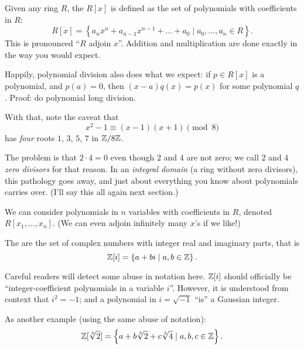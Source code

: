 \begin{example}
	Given any ring $R$,
	the  $R[x]$ is defined as the set of polynomials
	with coefficients in $R$:
	\[ R[x] = \left\{ a_n x^n+a_{n-1}x^{n-1}+\dots+a_0
		\mid a_0, \dots, a_n \in R \right\}. \]
	This is pronounced ``$R$ adjoin $x$''.
	Addition and multiplication are done exactly in the way you would expect.
\end{example}
\begin{remark}
	Happily, polynomial division also does what we expect:
	if $p \in R[x]$ is a polynomial, and $p(a) = 0$,
	then $(x-a)q(x) = p(x)$ for some polynomial $q$.
	Proof: do polynomial long division.

	With that, note the caveat that
	\[ x^2-1 \equiv (x-1)(x+1) \pmod 8 \]
	has \emph{four} roots $1$, $3$, $5$, $7$ in $\mathbb Z/8\mathbb Z$.

	The problem is that $2 \cdot 4 = 0$ even though $2$ and $4$ are not zero;
	we call $2$ and $4$ \emph{zero divisors} for that reason.
	In an \emph{integral domain} (a ring without zero divisors),
	this pathology goes away,
	and just about everything you know about polynomials carries over.
	(I'll say this all again next section.)
\end{remark}
\begin{example}
	We can consider polynomials in $n$ variables with coefficients in $R$,
	denoted $R[x_1, \dots, x_n]$.
	(We can even adjoin infinitely many $x$'s if we like!)
\end{example}

\begin{example}
	The  are the set of complex numbers
	with integer real and imaginary parts, that is
	\[ \mathbb Z[i] = \left\{ a+bi \mid a,b \in \mathbb Z \right\}. \]
\end{example}
\begin{abuse}
	Careful readers will detect some abuse in notation here.
	$\mathbb Z[i]$ should officially be
	``integer-coefficient polynomials in a variable $i$''.
	However, it is understood from context that $i^2=-1$;
	and a polynomial in $i = \sqrt{-1}$ ``is'' a Gaussian integer.
\end{abuse}
\begin{example}
	As another example (using the same abuse of notation):
	\[ \mathbb Z[\sqrt[3]{2}] = \left\{ a + b\sqrt[3]{2} + c\sqrt[3]4
		\mid a,b,c \in \mathbb Z \right\}. \]
\end{example}

